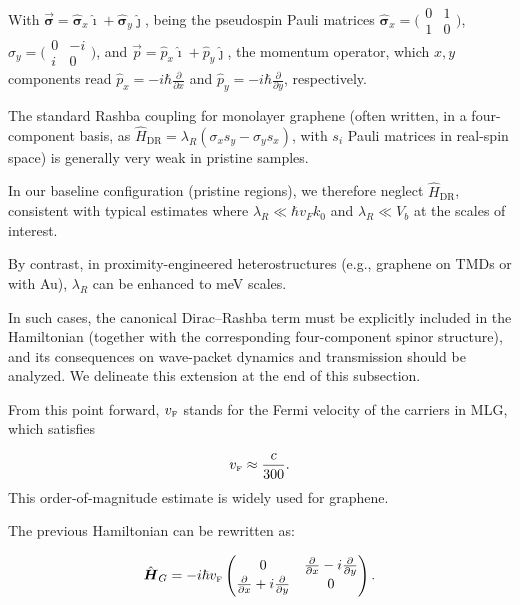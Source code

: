 \noindent With $\vec{\mathbf{\sigma}} = \hat{\mathbf{\sigma}}_{x}\hat{\imath} + \hat{\mathbf{\sigma}}_{y}\hat{\jmath}$, being the pseudospin Pauli matrices $\hat{\mathbf{\sigma}}_{x} = \bigl(\begin{smallmatrix}
0&1 \\ 1&0
\end{smallmatrix} \bigr)$, $\hat{\sigma}_{y} = \bigl(\begin{smallmatrix}
                                                         0&-i \\ i&0
\end{smallmatrix} \bigr)$, and $\vec{p}=\hat{p}_{x}\hat{\imath}+\hat{p}_{y}\hat{\jmath}$, the momentum operator, which $x, y$ components read $\hat{p}_{x} = -i\hbar\frac{\partial}{\partial x}$ and $\hat{p}_{y} = -i\hbar\frac{\partial}{\partial y}$, respectively.

The standard Rashba coupling for monolayer graphene (often written, in a four-component basis, as $\hat{H}_{\mathrm{DR}}=\lambda_R(\sigma_x s_y-\sigma_y s_x)$, with $s_i$ Pauli matrices in real-spin space) is generally very weak in pristine samples.

In our baseline configuration (pristine regions), we therefore neglect $\hat{H}_{\mathrm{DR}}$, consistent with typical estimates where $\lambda_R \ll \hbar v_F k_0$ and $\lambda_R \ll V_b$ at the scales of interest.

By contrast, in proximity-engineered heterostructures (e.g., graphene on TMDs or with Au), $\lambda_R$ can be enhanced to meV scales\cite{AvsarNatCommun2014, WangPhysRevX2016}.

In such cases, the canonical Dirac--Rashba term must be explicitly included in the Hamiltonian (together with the corresponding four-component spinor structure), and its consequences on wave-packet dynamics and transmission should be analyzed. We delineate this extension at the end of this subsection.


From this point forward, $v_{\mbox{\tiny F}}$ stands for the Fermi velocity of the carriers in MLG, which satisfies

\begin{equation}
    \label{eq:vF}
    v_{\mbox{\tiny F}} \approx \frac{c}{300}.
\end{equation}
This order-of-magnitude estimate is widely used for graphene\cite{Geimk2007}.

The previous Hamiltonian can be rewritten as:

\begin{equation}
    \label{eq:pristineGrapheneMatrix}
    \hat{\mbox{\boldmath $H$}}_G = -i\hbar v_{\mbox{\tiny F}}
    \begin{pmatrix}
        0                                                         & \frac{\partial}{\partial x}- i\frac{\partial}{\partial y} \\
        \frac{\partial}{\partial x}+ i\frac{\partial}{\partial y} & 0
    \end{pmatrix}.
\end{equation}

